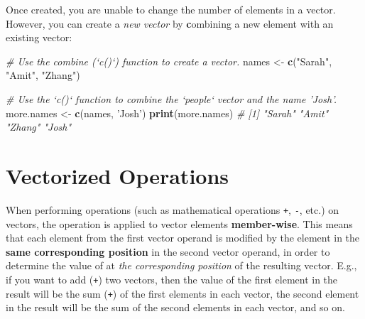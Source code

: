 \documentclass[]{book}
\newenvironment{Shaded}{\begin{snugshade}}{\end{snugshade}}
\newcommand{\KeywordTok}[1]{\textcolor[rgb]{0.13,0.29,0.53}{\textbf{#1}}}
\newcommand{\StringTok}[1]{\textcolor[rgb]{0.31,0.60,0.02}{#1}}
\newcommand{\CommentTok}[1]{\textcolor[rgb]{0.56,0.35,0.01}{\textit{#1}}}
\newcommand{\NormalTok}[1]{#1}
\theoremstyle{definition}
\theoremstyle{definition}
\theoremstyle{remark}
\begin{document}
Once created, you are unable to change the number of elements in a
vector. However, you can create a \emph{new vector} by
\textbf{c}ombining a new element with an existing vector:

\begin{Shaded}
\begin{Highlighting}[]
\CommentTok{# Use the combine (`c()`) function to create a vector.}
\NormalTok{names <-}\StringTok{ }\KeywordTok{c}\NormalTok{(}\StringTok{"Sarah"}\NormalTok{, }\StringTok{"Amit"}\NormalTok{, }\StringTok{"Zhang"}\NormalTok{)}

\CommentTok{# Use the `c()` function to combine the `people` vector and the name 'Josh'.}
\NormalTok{more.names <-}\StringTok{ }\KeywordTok{c}\NormalTok{(names, }\StringTok{'Josh'}\NormalTok{)}
\KeywordTok{print}\NormalTok{(more.names)  }\CommentTok{# [1] "Sarah" "Amit"  "Zhang" "Josh"}
\end{Highlighting}
\end{Shaded}

\section{Vectorized Operations}\label{vectorized-operations}

When performing operations (such as mathematical operations \texttt{+},
\texttt{-}, etc.) on vectors, the operation is applied to vector
elements \textbf{member-wise}. This means that each element from the
first vector operand is modified by the element in the \textbf{same
corresponding position} in the second vector operand, in order to
determine the value of at \emph{the corresponding position} of the
resulting vector. E.g., if you want to add (\texttt{+}) two vectors,
then the value of the first element in the result will be the sum
(\texttt{+}) of the first elements in each vector, the second element in
the result will be the sum of the second elements in each vector, and so
on.
\end{document}
